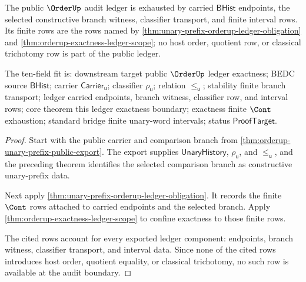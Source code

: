 \begin{theorem}
\label{thm:totalorder-orderup-public-audit-ledger-exactness}
The public $\OrderUp$ audit ledger is exhausted by carried
$\mathsf{BHist}$ endpoints, the selected constructive branch witness,
classifier transport, and finite interval rows. Its finite rows are the rows
named by \autoref{thm:unary-prefix-orderup-ledger-obligation} and
\autoref{thm:orderup-exactness-ledger-scope}; no host order, quotient row, or
classical trichotomy row is part of the public ledger.

The ten-field fit is: downstream target public $\OrderUp$ ledger exactness;
BEDC source $\mathsf{BHist}$; carrier $\mathsf{Carrier}_{\mathsf{u}}$;
classifier $\rho_{\mathsf{u}}$; relation $\le_{\mathsf{u}}$; stability finite
branch transport; ledger carried endpoints, branch witness, classifier row,
and interval rows; core theorem this ledger exactness boundary; exactness
finite $\Cont$ exhaustion; standard bridge finite unary-word intervals; status
$\mathsf{ProofTarget}$.
\end{theorem}
\begin{proof}
Start with the public carrier and comparison branch from
\autoref{thm:orderup-unary-prefix-public-export}. The export supplies
$\mathsf{UnaryHistory}$, $\rho_{\mathsf{u}}$, and
$\le_{\mathsf{u}}$, and the preceding theorem identifies the selected
comparison branch as constructive unary-prefix data.

Next apply \autoref{thm:unary-prefix-orderup-ledger-obligation}. It records
the finite $\Cont$ rows attached to carried endpoints and the selected branch.
Apply \autoref{thm:orderup-exactness-ledger-scope} to confine exactness to
those finite rows.

The cited rows account for every exported ledger component: endpoints, branch
witness, classifier transport, and interval data. Since none of the cited
rows introduces host order, quotient equality, or classical trichotomy, no
such row is available at the audit boundary.
\end{proof}

